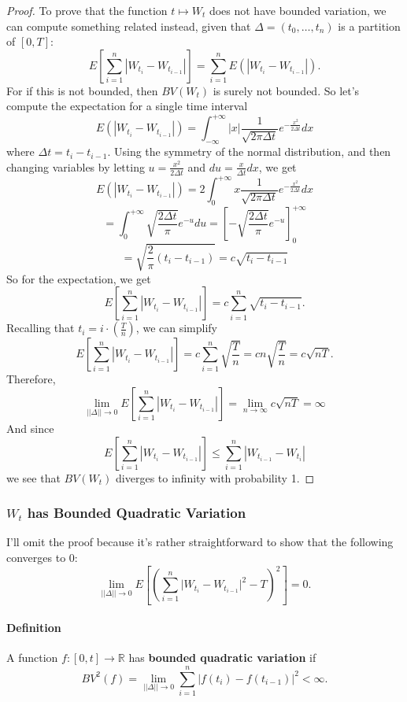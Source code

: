 \documentclass[a4paper,12pt]{scrartcl}
\begin{document}
      \begin{proof}
	 To prove that the function $t \mapsto W_t$ does not have bounded
	 variation, we can compute something related instead, given that
	 $\Delta = (t_0, \ldots, t_n)$ is a partition of $[0,T]$:
	    \[E\left[\sum^n_{i=1} |W_{t_i} - W_{t_{i-1}}|\right] = 
	       \sum^n_{i=1} E(|W_{t_i} - W_{t_{i-1}}|) .\]
	 For if this is not bounded, then $BV(W_t)$ is surely not 
	 bounded. So let's compute the expectation for a single time
	 interval
	 \[E(|W_{t_i} - W_{t_{i-1}}|) = \int^{+\infty}_{-\infty}
	    |x| \frac{1}{\sqrt{2\pi \Delta t}} e^{-\frac{x^2}{2\Delta t}}
	    dx \]
	 where $\Delta t = t_i - t_{i-1}$. Using the symmetry of the 
	 normal distribution, and then changing variables by letting
	 $u = \frac{x^2}{2\Delta t}$ and $du=\frac{x}{\Delta t}dx$, 
	 we get
	    \[ E(|W_{t_i} - W_{t_{i-1}}|) = 2 \int^{+\infty}_{0}
	       x\frac{1}{\sqrt{2\pi \Delta t}} e^{-\frac{x^2}{2\Delta t}}
	       dx \] 
	    \[ = \int^{+\infty}_{0} \sqrt{\frac{2 \Delta t}{\pi}}
	       e^{-u} du = \left[ -\sqrt{\frac{2 \Delta t}{\pi}} e^{-u}
	       \right]^{+\infty}_{0} \] 
	    \[ = \sqrt{\frac{2}{\pi} (t_i - t_{i-1})}
	       = c\sqrt{t_i-t_{i-1}}  \]
	 So for the expectation, we get
	    \[ E\left[\sum^n_{i=1} |W_{t_i} - W_{t_{i-1}}|\right] 
	       = c \sum_{i=1}^n \sqrt{t_i - t_{i-1}}.\]
	 Recalling that $t_i = i \cdot (\frac{T}{n})$, we can simplify
	    \[ E\left[\sum^n_{i=1} |W_{t_i} - W_{t_{i-1}}|\right]  =
	       c \sum_{i=1}^n \sqrt{\frac{T}{n}} =cn\sqrt{\frac{T}{n}} =
	       c\sqrt{nT}.\]
	 Therefore,
	    \[ \lim_{||\Delta|| \rightarrow 0} E\left[\sum^n_{i=1} 
	       |W_{t_i}-W_{t_{i-1}}|\right]=\lim_{n\rightarrow \infty}
	       c\sqrt{nT} = \infty \]
	 And since 
	    \[E\left[\sum^n_{i=1}|W_{t_i}-W_{t_{i-1}}|\right] \leq
	       \sum^n_{i=1} |W_{t_{i-1}} - W_{t_i}| \]
	 we see that $BV(W_t)$ diverges to infinity with probability 1.
      \end{proof}

\subsubsection{$W_t$ has Bounded Quadratic Variation} 

      I'll omit the proof because it's rather 
      straightforward to show that the following converges to 0:
      \[ \lim_{||\Delta || \rightarrow 0} E\left[ \left(\sum_{i=1}^n 
	 \lvert W_{t_i} - W_{t_{i-1}} \rvert^2 -T\right)^2 \right]=0.\] 

      \paragraph{Definition} A function $f: [0,t] \rightarrow \mathbb{R}$
      has \textbf{bounded quadratic variation} if 
	 \[ BV^2(f) = \lim_{||\Delta|| \rightarrow 0} \sum^n_{i=1} 
	    \left\lvert f(t_i) - f(t_{i-1}) \right\rvert^2 < \infty.\]
      
\end{document}
